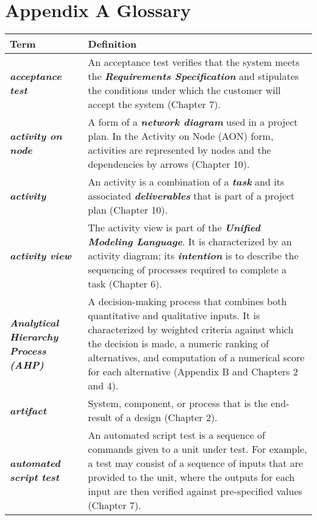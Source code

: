 \chapter*{Appendix A Glossary}

\begin{longtable} { p{4cm} p{11cm}} 

Term & Definition \\ 
\endhead

\emph{\textbf{acceptance test}} &
An acceptance test verifies that the system meets the  
\emph{\textbf{Requirements Specification}} and stipulates the conditions
under which the customer will accept the system (Chapter 7). \\

\emph{\textbf{activity on node}} & A form of a \emph{\textbf{network
diagram}} used in a project plan. In the Activity on Node (AON) form,
activities are represented by nodes and the dependencies by arrows
(Chapter 10). \\

\emph{\textbf{activity}} & An activity is a combination of a
\emph{\textbf{task}} and its associated \emph{\textbf{deliverables}}
that is part of a project plan (Chapter 10). \\

\emph{\textbf{activity view}} & The activity view is part of the
\emph{\textbf{Unified Modeling Language}}. It is characterized by an
activity diagram; its \emph{\textbf{intention}} is to describe the
sequencing of processes required to complete a task (Chapter 6). \\

\emph{\textbf{Analytical Hierarchy Process (AHP)}} & A decision-making
process that combines both quantitative and qualitative inputs. It is
characterized by weighted criteria against which the decision is made, a
numeric ranking of alternatives, and computation of a numerical score
for each alternative (Appendix B and Chapters 2 and 4). \\

\emph{\textbf{artifact}} & System, component, or process that is the
end-result of a design (Chapter 2). \\

\emph{\textbf{automated script test}} & An automated script test is a
sequence of commands given to a unit under test. For example, a test may
consist of a sequence of inputs that are provided to the unit, where the
outputs for each input are then verified against pre-specified values
(Chapter 7). \\


\end{longtable}
